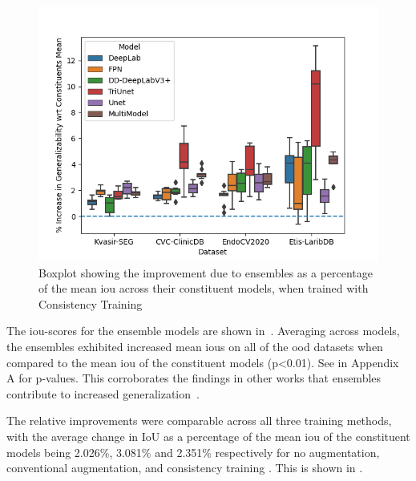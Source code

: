 \begin{figure}[htb]
    \centering
    \includegraphics[width=\linewidth]{illustrations/improvements_due_to_ensembles.png}
    \caption[Improvements due to Ensembles]{Boxplot showing the improvement due to ensembles as a percentage of the mean \gls{iou} across their constituent models, when trained with Consistency Training}
    \label{fig:ensemble_improvements}
\end{figure}
The \gls{iou}-scores for the ensemble models are shown in~. Averaging across models, the ensembles exhibited increased mean \glspl{iou} on all of the \gls{ood} datasets when compared to the mean \gls{iou} of the constituent models (p<0.01). See  in Appendix A for p-values. This corroborates the findings in other works that ensembles contribute to increased generalization~\cite{endoensemble, divergentnets}. 

The relative improvements were comparable across all three training methods, with the average change in IoU as a percentage of the mean \gls{iou} of the constituent models being 2.026\%, 3.081\% and 2.351\% respectively for no augmentation, conventional augmentation, and consistency training . This is shown in . 

